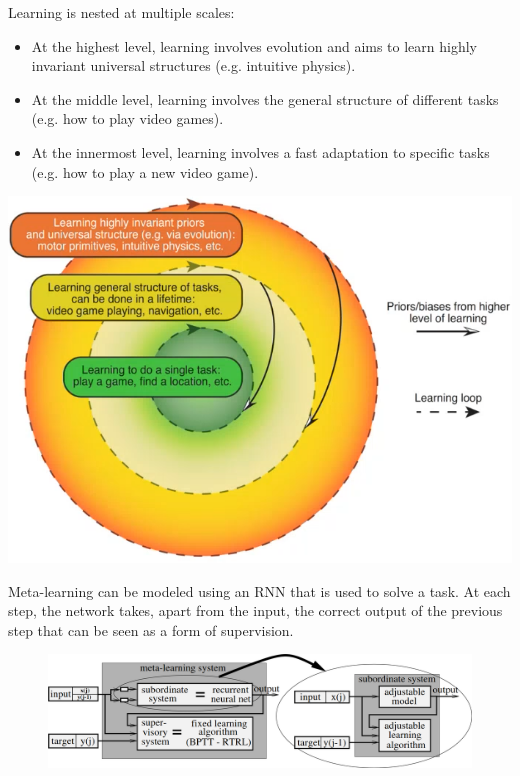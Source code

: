 \begin{remark}
    Learning is nested at multiple scales:\\[0.5em]
    \begin{minipage}{0.55\linewidth}
        \begin{itemize}
            \item At the highest level, learning involves evolution and aims to learn highly invariant universal structures (e.g. intuitive physics).
            \item At the middle level, learning involves the general structure of different tasks (e.g. how to play video games).
            \item At the innermost level, learning involves a fast adaptation to specific tasks (e.g. how to play a new video game).
        \end{itemize}
    \end{minipage}
    \begin{minipage}{0.4\linewidth}
        \centering
        \includegraphics[width=0.95\linewidth]{./img/nested_learning.png}
    \end{minipage}
\end{remark}

\begin{casestudy}
    Meta-learning can be modeled using an RNN that is used to solve a task.
    At each step, the network takes, apart from the input, the correct output of the previous step that can be seen as a form of supervision.

    \begin{figure}[H]
        \centering
        \includegraphics[width=0.6\linewidth]{./img/human_meta.png}
    \end{figure}
\end{casestudy}

